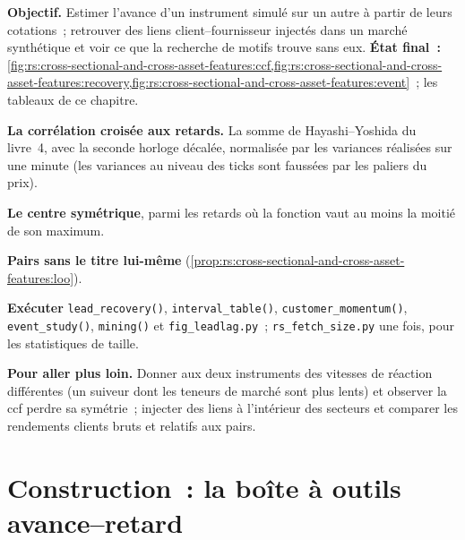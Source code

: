 \begin{tutorial}
\textbf{Objectif.} Estimer l'avance d'un instrument simulé sur un autre à partir de leurs cotations~; retrouver des liens client--fournisseur injectés
dans un marché synthétique et voir ce que la recherche de motifs trouve sans eux. \textbf{État final~:}
\cref{fig:rs:cross-sectional-and-cross-asset-features:ccf,fig:rs:cross-sectional-and-cross-asset-features:recovery,fig:rs:cross-sectional-and-cross-asset-features:event}~;
les tableaux de ce chapitre.
\begin{tutsteps}
\item \textbf{La corrélation croisée aux retards.} La somme de Hayashi--Yoshida du livre~4, avec la seconde horloge décalée, normalisée par les variances réalisées sur une minute
(les variances au niveau des ticks sont faussées par les paliers du prix).
\label{lst:rs:cross-sectional-and-cross-asset-features:ccf}
\item \textbf{Le centre symétrique}, parmi les retards où la fonction vaut au moins la moitié de son maximum.
\label{lst:rs:cross-sectional-and-cross-asset-features:centre}
\item \textbf{Pairs sans le titre lui-même} (\cref{prop:rs:cross-sectional-and-cross-asset-features:loo}).
\label{lst:rs:cross-sectional-and-cross-asset-features:peer}
\item \textbf{Exécuter} \texttt{lead\_recovery()}, \texttt{interval\_table()}, \texttt{customer\_momentum()}, \texttt{event\_study()},
\texttt{mining()} et \texttt{fig\_leadlag.py}~; \texttt{rs\_fetch\_size.py} une fois, pour les statistiques de taille.
\end{tutsteps}
\textbf{Pour aller plus loin.} Donner aux deux instruments des vitesses de réaction différentes (un suiveur dont les teneurs de marché sont plus lents) et observer
la ccf perdre sa symétrie~; injecter des liens à l'intérieur des secteurs et comparer les rendements clients bruts et relatifs aux pairs.
\end{tutorial}

\section{Construction~: la boîte à outils avance--retard}\label{bld:rs:cross-sectional-and-cross-asset-features:leadlag}

